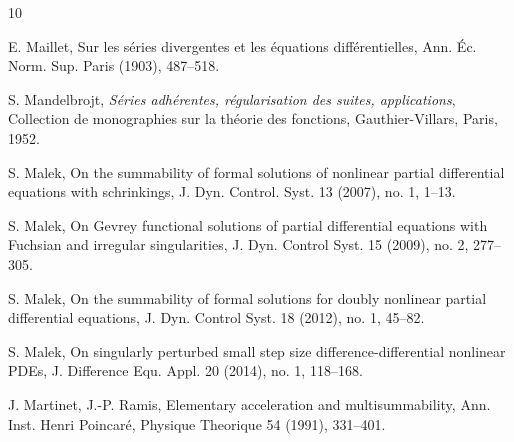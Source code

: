 \documentclass[11pt,a4paper]{article}
\theoremstyle{definition}
\begin{document}
\begin{thebibliography}{10}

 E. Maillet, Sur les s\'eries divergentes et les \'equations diff\'erentielles,
Ann. \'Ec. Norm. Sup. Paris (1903), 487--518.

 S. Mandelbrojt,
\emph{S\'eries adh\'erentes, r\'egularisation des suites, applications}, Collection de monographies
sur la th\'eorie des fonctions, Gauthier-Villars, Paris, 1952.

%
 S. Malek, On the summability of formal solutions of nonlinear partial differential
equations with schrinkings, J. Dyn. Control. Syst. 13 (2007), no. 1, 1--13.

 S. Malek, On Gevrey functional solutions of partial differential equations with
Fuchsian and irregular singularities, J. Dyn. Control Syst. 15 (2009), no. 2, 277--305.

 S. Malek, On the summability of formal solutions for doubly nonlinear
partial differential equations, J. Dyn. Control Syst. 18 (2012), no. 1, 45--82.

 S. Malek, On singularly perturbed small step size difference-differential
nonlinear PDEs, J. Difference Equ. Appl. 20 (2014), no. 1, 118--168.









 J. Martinet, J.-P. Ramis,
Elementary acceleration and multisummability, Ann. Inst. Henri Poincar\'e, Physique Theorique 54 (1991), 331--401.


\end{thebibliography}
\end{document}
